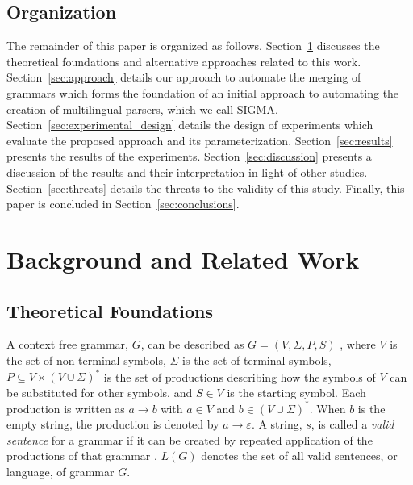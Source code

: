 \documentclass[conference]{IEEEtran}
\begin{document}
\hypertarget{organization}{%
\subsection*{Organization}\label{organization}}

The remainder of this paper is organized as follows.
Section~\ref{sec:background} discusses the theoretical foundations and
alternative approaches related to this work. Section~\ref{sec:approach}
details our approach to automate the merging of grammars which forms the
foundation of an initial approach to automating the creation of
multilingual parsers, which we call SIGMA.
Section~\ref{sec:experimental_design} details the design of experiments
which evaluate the proposed approach and its parameterization.
Section~\ref{sec:results} presents the results of the experiments.
Section~\ref{sec:discussion} presents a discussion of the results and
their interpretation in light of other studies.
Section~\ref{sec:threats} details the threats to the validity of this
study. Finally, this paper is concluded in
Section~\ref{sec:conclusions}.

\hypertarget{sec:background}{%
\section{Background and Related Work}\label{sec:background}}

\hypertarget{sec:foundations}{%
\subsection{Theoretical Foundations}\label{sec:foundations}}

A context free grammar, \(G\), can be described as
\(G = (V,\Sigma{},P,S)\)
\cite{haoxiangLanguagesMachinesIntroduction1988}, where \(V\) is the set
of non-terminal symbols, \(\Sigma\) is the set of terminal symbols,
\(P \subseteq V \times (V\cup\Sigma)^*\) is the set of productions
describing how the symbols of \(V\) can be substituted for other
symbols, and \(S \in V\) is the starting symbol. Each production is
written as \(a \rightarrow b\) with \(a \in V\) and
\(b \in (V\cup\Sigma)^*\). When \(b\) is the empty string, the
production is denoted by \(a \rightarrow \varepsilon\). A string, \(s\),
is called a \emph{valid sentence} for a grammar if it can be created by
repeated application of the productions of that grammar
\cite{moonenGeneratingRobustParsers2001}. \(L(G)\) denotes the set of
all valid sentences, or language, of grammar \(G\).
\end{document}

